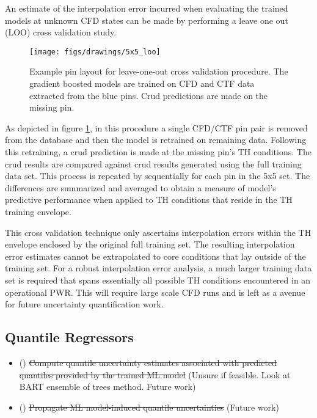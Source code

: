 An estimate of the interpolation error incurred when evaluating the trained models at unknown CFD states can be made by performing a leave one out (LOO) cross validation study.

\begin{figure}[h]
    \centering
    \texttt{[image: figs/drawings/5x5\_loo]}
    \caption[Example pin layout for leave-one-out cross validation procedure.]{Example pin layout for leave-one-out cross validation procedure.  The gradient boosted models are trained on CFD and CTF data extracted from the blue pins.  Crud predictions are made on the missing pin.}
    \label{fig:5x5loo}
\end{figure}


As depicted in figure \ref{fig:5x5loo}, in this procedure a single CFD/CTF pin pair is removed from the database and then the model is retrained on remaining data.  Following this retraining, a crud prediction is made 
at the missing pin's TH conditions.  The crud results are compared against crud results generated using the full training data set.  This process is repeated by sequentially for each pin in the 5x5 set.  The differences are summarized and averaged to obtain a measure of model's predictive performance when applied to TH conditions that reside in the TH training envelope.

This cross validation technique only ascertains interpolation errors within the TH envelope enclosed by the original full training set.  The resulting interpolation error estimates cannot be extrapolated to core conditions that lay outside of the training set.  For a robust interpolation error analysis, a much larger training data set is required
that spans essentially all possible TH conditions encountered in an operational PWR.  This will require large scale CFD runs and is left as a avenue for future uncertainty quantification work.

\subsection{Quantile Regressors}

\begin{itemize}   
    \item (\xmark) \sout{Compute quantile uncertainty estimates associated with predicted quantiles provided by the trained ML model} (Unsure if feasible.  Look at BART ensemble of trees method. Future work)
    \item (\xmark) \sout{Propagate ML model-induced quantile uncertainties} (Future work)
\end{itemize}


